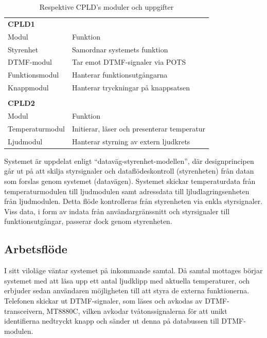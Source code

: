 \documentclass[a4paper,11pt]{article}
\begin{document}
	\begin{table} [H]
		
		\caption{Respektive CPLD's moduler och uppgifter} 
		\label{tab:uppdelningstabell}
	\begin{tabular}{l l}
		
		{\bf CPLD1} \\
		Modul	& Funktion	\\
		\hline
		Styrenhet	& Samordnar systemets funktion \\
		DTMF-modul & Tar emot DTMF-signaler via POTS \\
		Funktionsmodul	& Hanterar funktionsutgångarna \\
		Knappmodul	& Hanterar tryckningar på knappsatsen \\
		\\
		{\bf CPLD2} \\
		Modul	& Funktion	\\
		\hline
		Temperaturmodul	& Initierar, läser och presenterar temperatur \\
		Ljudmodul	& Hanterar styrning av extern ljudkrets \\
		
	\end{tabular}
	\end{table}
	
	Systemet är uppdelat enligt ``dataväg-styrenhet-modellen'', där designprincipen går ut på att skilja styrsignaler
	och dataflödeskontroll (styrenheten) från datan som forslas genom systemet (datavägen). Systemet skickar temperaturdata från temperaturmodulen till ljudmodulen samt adressdata till ljludlagringsenheten från ljudmodulen. Detta flöde kontrolleras från styrenheten via
	enkla styrsignaler. Viss data, i form av indata från användargränssnitt och styrsignaler till funktionsutgångar, passerar dock genom styrenheten.

	\subsection{Arbetsflöde}

I sitt viloläge väntar systemet på inkommande samtal. Då samtal mottages börjar systemet med att läsa upp ett antal ljudklipp med aktuella temperaturer, och erbjuder sedan användaren möjligheten till att styra de externa funktionerna. Telefonen skickar ut DTMF-signaler, som läses och avkodas av DTMF-transceivern, MT8880C, vilken avkodar tvåtonssignalerna för att unikt identifierna nedtryckt knapp och sänder ut denna på databussen till DTMF-modulen. 
\end{document}
